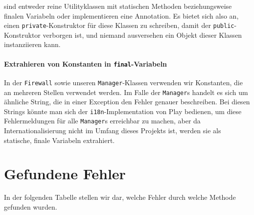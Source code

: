 \documentclass[12pt,DIV14,BCOR10mm,a4paper,parskip=half-,headsepline,headinclude,english,ngerman,bibliography=totocnumbered]{scrreprt}
\begin{document}
sind entweder reine Utilityklassen mit statischen Methoden beziehungsweise finalen Variabeln oder implementieren eine Annotation.
Es bietet sich also an, einen \texttt{private}-Konstruktor für diese Klassen zu schreiben, damit der \texttt{public}-Konstruktor verborgen ist, und niemand ausversehen ein Objekt dieser Klassen instanziieren kann.

\subsubsection{Extrahieren von Konstanten in \texttt{final}-Variabeln}

In der \texttt{Firewall} sowie unseren \texttt{Manager}-Klassen verwenden wir Konstanten, die an mehreren Stellen verwendet werden.
Im Falle der \texttt{Manager}s handelt es sich um ähnliche String, die in einer Exception den Fehler genauer beschreiben.
Bei diesen Strings könnte man sich der \texttt{i18n}-Implementation von Play bedienen, um diese Fehlermeldungen für alle \texttt{Manager}s erreichbar zu machen, aber da Internationalisierung nicht im Umfang dieses Projekts ist, werden sie als statische, finale Variabeln extrahiert.



\chapter{Gefundene Fehler}

In der folgenden Tabelle stellen wir dar, welche Fehler durch welche Methode gefunden wurden.
\end{document}
